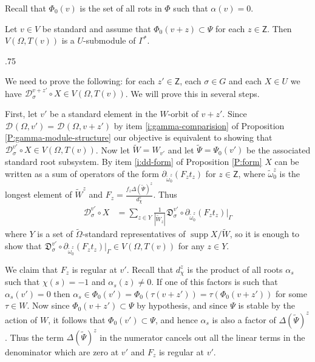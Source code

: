 \documentclass[11pt,fleqn]{amsart}
\makeatletter
\renewcommand\proofname{Proof}
\renewenvironment{proof}[1][\textit{\proofname}]{\par
 \pushQED{\qed}%
 \normalfont \topsep.75\paraskip\relax
 \trivlist
 \item[\hskip\labelsep
 \itshape
 #1\@addpunct{.}]\ignorespaces
}{%
 \popQED\endtrivlist\@endpefalse
}
\newcounter{para}[section]
\newcommand\D[3]{{}^{#1} \mathfrak D_{#2}^{#3}}
\newcommand\DD[3]{{}^{#1} \mathcal D_{#2}^{#3}}
\newcommand\Z{\mathsf Z}
\DeclareMathOperator\supp{supp}
\makeatother
\begin{document}
Recall that $\Phi_0(v)$ is the set of all rots in $\Phi$ such that $\alpha(v)
= 0$.
\begin{Theorem}
\label{T:module-structure}
Let $v \in V$ be standard and assume that $\Phi_0(v+z) \subset \Psi$ for each 
$z \in \Z$. Then $V(\Omega, T(v))$ is a $U$-submodule of $\Gamma^*$.
\end{Theorem}
\begin{proof}
We need to prove the following: for each $z' \in \Z$, each $\sigma \in G$ and
each $X \in U$ we have $\DD{}{\sigma}{v+z'} \circ X \in V(\Omega, T(v))$. We will
prove this in several steps.

First, let $v'$ be a standard element in the $W$-orbit of $v + z'$. Since 
$\DD{}{}{}(\Omega, v') = \DD{}{}{}(\Omega, v+ z')$ by item 
\ref{i:gamma-comparision} of Proposition \ref{P:gamma-module-structure}
our objective is equivalent to showing that $\DD{}{\sigma}{v'} \circ X \in 
V(\Omega, T(v))$. Now let $\widetilde W = W_{v'}$ and let $\widetilde \Psi = \Psi_0(v')$ be 
the associated standard root subsystem. By item \ref{i:dd-form} of Proposition 
\ref{P:form} $X$ can be written as a sum of operators of the form 
$\partial_{\widetilde \omega_0^z}(F_z t_z)$ for $z \in \Z$, where $\widetilde 
\omega_0^z$ is the longest element of $\widetilde W^z$ and $F_z = \frac{f_z 
\Delta(\widetilde \Psi)^z}{d_\chi^z}$. Thus 
\begin{align*}
\DD{}{\sigma}{v'} \circ X
	&= \sum_{z \in Y} \frac{1}{|\widetilde W_z|}
		\D{}{\sigma}{v'} \circ \partial_{\widetilde \omega_0^{z}}(
			F_z t_z)|_\Gamma
\end{align*}
where $Y$ is a set of $\widetilde \Omega$-standard representatives of $\supp X / 
\widetilde W$, so it is enough to show that $\D{}{\sigma}{v'} \circ 
\partial_{\widetilde \omega_0^z}(F_z t_z)|_\Gamma \in V(\Omega, T(v))$ for any $z \in 
Y$.

We claim that $F_z$ is regular at $v'$. Recall that $d_\chi^z$ is the product
of all roots $\alpha_s$ such that $\chi(s) = -1$ and $\alpha_s(z) \neq 0$. If
one of this factors is such that $\alpha_s(v') = 0$ then $\alpha_s \in 
\Phi_0(v') = \Phi_0(\tau(v+z')) = \tau(\Phi_0(v+z'))$ for some $\tau \in W$. 
Now since $\Phi_0(v+z') \subset \Psi$ by hypothesis, and since $\Psi$ is stable
by the action of $W$, it follows that $\Phi_0(v') \subset \Psi$, and hence 
$\alpha_s$ is also a factor of $\Delta(\widetilde \Psi)^z$. Thus the term
$\Delta(\widetilde \Psi)^z$ in the numerator cancels out all the linear terms in
the denominator which are zero at $v'$ and $F_z$ is regular at $v'$.


\end{proof}
\end{document}

